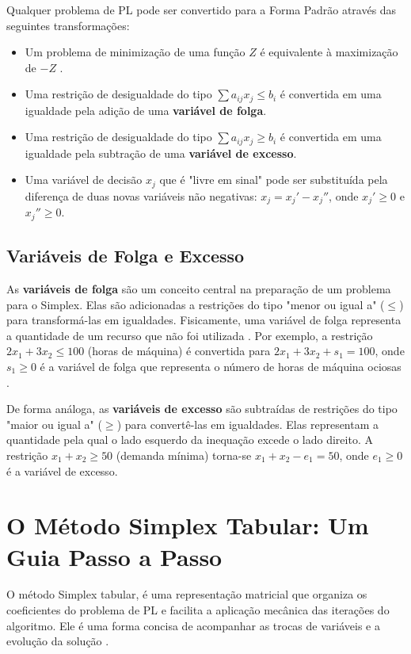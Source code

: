 \documentclass[conference]{IEEEtran}
\begin{document}
Qualquer problema de PL pode ser convertido para a Forma Padrão através das seguintes transformações:
\begin{itemize}
    \item Um problema de minimização de uma função $Z$ é equivalente à maximização de $-Z$ \cite{milhomem}.
    \item Uma restrição de desigualdade do tipo $\sum a_{ij}x_j \le b_i$ é convertida em uma igualdade pela adição de uma \textbf{variável de folga}.
    \item Uma restrição de desigualdade do tipo $\sum a_{ij}x_j \ge b_i$ é convertida em uma igualdade pela subtração de uma \textbf{variável de excesso}.
    \item Uma variável de decisão $x_j$ que é "livre em sinal" pode ser substituída pela diferença de duas novas variáveis não negativas: $x_j = x_j' - x_j''$, onde $x_j' \ge 0$ e $x_j'' \ge 0$.
\end{itemize}

\subsection{Variáveis de Folga e Excesso}
As \textbf{variáveis de folga} são um conceito central na preparação de um problema para o Simplex. Elas são adicionadas a restrições do tipo "menor ou igual a" ($\le$) para transformá-las em igualdades. Fisicamente, uma variável de folga representa a quantidade de um recurso que não foi utilizada \cite{silva2017}. Por exemplo, a restrição $2x_1 + 3x_2 \le 100$ (horas de máquina) é convertida para $2x_1 + 3x_2 + s_1 = 100$, onde $s_1 \ge 0$ é a variável de folga que representa o número de horas de máquina ociosas \cite{menezes}.

De forma análoga, as \textbf{variáveis de excesso} são subtraídas de restrições do tipo "maior ou igual a" ($\ge$) para convertê-las em igualdades. Elas representam a quantidade pela qual o lado esquerdo da inequação excede o lado direito. A restrição $x_1 + x_2 \ge 50$ (demanda mínima) torna-se $x_1 + x_2 - e_1 = 50$, onde $e_1 \ge 0$ é a variável de excesso.


\section{O Método Simplex Tabular: Um Guia Passo a Passo}
O método Simplex tabular, é uma representação matricial que organiza os coeficientes do problema de PL e facilita a aplicação mecânica das iterações do algoritmo. Ele é uma forma concisa de acompanhar as trocas de variáveis e a evolução da solução \cite{menezes}.
\end{document}
